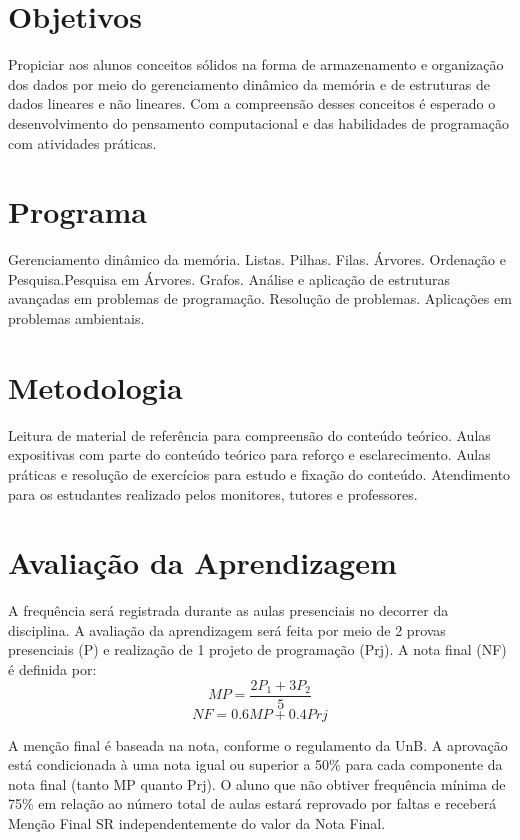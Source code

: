 \documentclass{UnBExam}%
\begin{document}
    \section{Objetivos}%
      \vspace{-0.5\baselineskip}%
      Propiciar aos alunos conceitos sólidos na forma de armazenamento e organização dos dados por meio do gerenciamento dinâmico da memória e de estruturas de dados lineares e não lineares. Com a compreensão desses conceitos é esperado o desenvolvimento do pensamento computacional e das habilidades de programação com atividades práticas.

    \section{Programa}%
        \vspace{-0.5\baselineskip}%
        Gerenciamento dinâmico da memória. Listas. Pilhas. Filas. Árvores. Ordenação e Pesquisa.Pesquisa em Árvores. Grafos. Análise e aplicação de estruturas avançadas em problemas de programação. Resolução de problemas. Aplicações em problemas ambientais.

    \section{Metodologia}%
        \vspace{-0.5\baselineskip}%
        Leitura de material de referência para compreensão do conteúdo teórico.
        Aulas expositivas com parte do conteúdo teórico para reforço e esclarecimento.
        Aulas práticas e resolução de exercícios para estudo e fixação do conteúdo.
        Atendimento para os estudantes realizado pelos monitores, tutores e professores.

    \section{Avaliação da Aprendizagem}%
        \vspace{-0.5\baselineskip}%
        A frequência será registrada durante as aulas presenciais no decorrer da disciplina.
        A avaliação da aprendizagem será feita por meio de 2 provas presenciais (P) e realização de 1 projeto de programação (Prj). A nota final (NF) é definida por:
        $$MP = \frac{2P_1+3P_2}{5}$$
        $$NF = 0.6MP+0.4Prj$$

        A menção final é baseada na nota, conforme o regulamento da UnB. A aprovação está condicionada à uma nota igual ou superior a 50\% para cada componente da nota final (tanto MP quanto Prj). O aluno que não obtiver frequência mínima de 75\% em relação ao número total de aulas estará reprovado por faltas e receberá Menção Final SR independentemente do valor da Nota Final.
\end{document}
